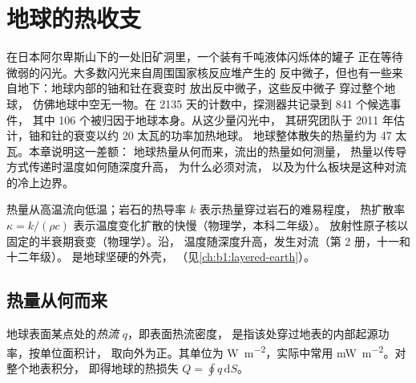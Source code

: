 \chapter{地球的热收支}\label{ch:b1:heat-budget}

在日本阿尔卑斯山下的一处旧矿洞里，一个装有千吨液体闪烁体的罐子
正在等待微弱的闪光。大多数闪光来自周围国家核反应堆产生的
反中微子，但也有一些来自地下：地球内部的铀和钍在衰变时
放出反中微子，这些反中微子
穿过整个地球，
仿佛地球中空无一物。在 2135 天的计数中，探测器共记录到 841 个候选事件，
其中 106 个被归因于地球本身。从这少量闪光中，
其研究团队于 2011 年估计，铀和钍的衰变以约 20 太瓦的功率加热地球。
地球整体散失的热量约为 47 太瓦。本章说明这一差额：
地球热量从何而来，流出的热量如何测量，
热量以传导方式传递时温度如何随深度升高，
为什么必须对流，
以及为什么板块是这种对流的冷上边界。

\begin{recall}
热量从高温流向低温；岩石的热导率 $k$ 表示热量穿过岩石的难易程度，
热扩散率 $\kappa = k/(\rho c)$ 表示温度变化扩散的快慢（物理学，本科二年级）。
放射性原子核以固定的半衰期衰变（物理学）。沿，
温度随深度升高，发生对流（第 2 册，十一和十二年级）。
是地球坚硬的外壳，
（见\cref{ch:b1:layered-earth}）。
\end{recall}

\section{热量从何而来}

\begin{definition}[热流]\label{def:b1:heat-budget:heat-flow}
地球表面某点处的\emph{热流} $q$，即表面热流密度，
是指该处穿过地表的内部起源功率，按单位面积计，
取向外为正。其单位为
\unit{W.m^{-2}}，实际中常用 \unit{mW.m^{-2}}。对整个地表积分，
即得地球的热损失 $Q = \oint q\,\mathrm dS$。
\end{definition}

